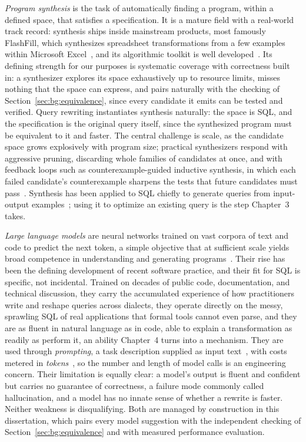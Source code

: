 \emph{Program synthesis} is the task of automatically finding a
program, within a defined space, that satisfies a specification. It
is a mature field with a real-world track record: synthesis ships
inside mainstream products, most famously FlashFill, which
synthesizes spreadsheet transformations from a few examples within
Microsoft Excel~\cite{gulwani2011automating}, and its algorithmic
toolkit is well developed~\cite{gulwani2017program}. Its defining
strength for our purposes is systematic coverage with correctness
built in: a synthesizer explores its space exhaustively up to
resource limits, misses nothing that the space can express, and
pairs naturally with the checking of
Section~\ref{sec:bg:equivalence}, since every candidate it emits can
be tested and verified. Query rewriting instantiates synthesis
naturally: the space is SQL, and the specification is the original
query itself, since the synthesized program must be equivalent to it
and faster. The central challenge is scale, as the candidate space
grows explosively with program size; practical synthesizers respond
with aggressive pruning, discarding whole families of candidates at
once, and with feedback loops such as counterexample-guided
inductive synthesis, in which each failed candidate's counterexample
sharpens the tests that future candidates must
pass~\cite{solar2008program}. Synthesis has been applied to SQL
chiefly to generate queries from input-output
examples~\cite{wang2017synthesizing}; using it to optimize an
existing query is the step Chapter~3 takes.

\emph{Large language models} are neural networks trained on vast
corpora of text and code to predict the next token, a simple
objective that at sufficient scale yields broad competence in
understanding and generating programs~\cite{zhao2023llm}. Their rise
has been the defining development of recent software practice, and
their fit for SQL is specific, not incidental. Trained on decades of
public code, documentation, and technical discussion, they carry the
accumulated experience of how practitioners write and reshape
queries across dialects, they operate directly on the messy,
sprawling SQL of real applications that formal tools cannot even
parse, and they are as fluent in natural language as in code, able
to explain a transformation as readily as perform it, an ability
Chapter~4 turns into a mechanism. They are used through
\emph{prompting}, a task description supplied as input
text~\cite{googleprompt}, with costs metered in
\emph{tokens}~\cite{openaitokens}, so the number and length of model
calls is an engineering concern. Their limitation is equally clear:
a model's output is fluent and confident but carries no guarantee of
correctness, a failure mode commonly called hallucination, and a
model has no innate sense of whether a rewrite is faster. Neither
weakness is disqualifying. Both are managed by construction in this
dissertation, which pairs every model suggestion with the
independent checking of Section~\ref{sec:bg:equivalence} and with
measured performance evaluation.

